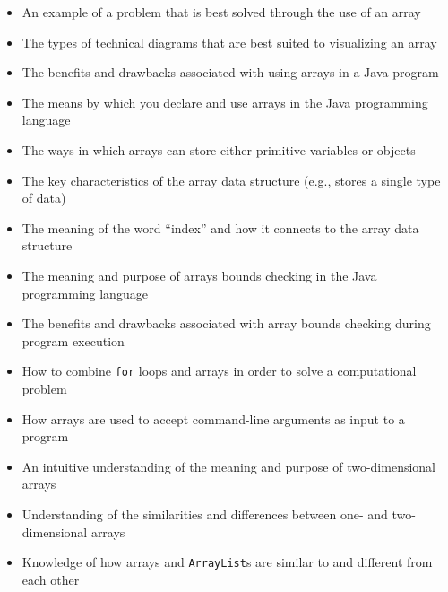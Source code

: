 \documentclass[11pt]{article}
\begin{document}
\begin{itemize}

  \itemsep 0in

  \item An example of a problem that is best solved through the use of an array
  \item The types of technical diagrams that are best suited to visualizing an array
  \item The benefits and drawbacks associated with using arrays in a Java program
  \item The means by which you declare and use arrays in the Java programming language
  \item The ways in which arrays can store either primitive variables or objects
  \item The key characteristics of the array data structure (e.g., stores a single type of data)
  \item The meaning of the word ``index'' and how it connects to the array data structure
  \item The meaning and purpose of arrays bounds checking in the Java programming language
  \item The benefits and drawbacks associated with array bounds
    checking during program execution
  \item How to combine {\tt for} loops and arrays in order to solve a computational problem
  \item How arrays are used to accept command-line arguments as input to a program
  \item An intuitive understanding of the meaning and purpose of two-dimensional arrays
  \item Understanding of the similarities and differences between one- and two-dimensional arrays
  \item Knowledge of how arrays and {\tt ArrayList}s are similar to and different from each other

\end{itemize}
\end{document}
